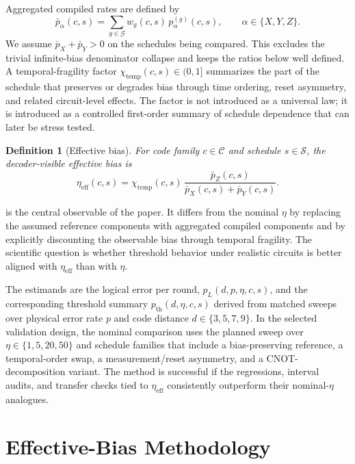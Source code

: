 \documentclass{article} %
\newtheorem{definition}[theorem]{Definition}
\begin{document}
Aggregated compiled rates are defined by
\begin{equation}
\label{eq:aggregated-components}
\bar p_\alpha(c,s) = \sum_{g \in \mathcal{G}} w_g(c,s)\, p_\alpha^{(g)}(c,s),
\qquad \alpha \in \{X,Y,Z\}.
\end{equation}
We assume $\bar p_X + \bar p_Y > 0$ on the schedules being compared. This excludes the trivial infinite-bias denominator collapse and keeps the ratios below well defined. A temporal-fragility factor $\chi_{\mathrm{temp}}(c,s) \in (0,1]$ summarizes the part of the schedule that preserves or degrades bias through time ordering, reset asymmetry, and related circuit-level effects. The factor is not introduced as a universal law; it is introduced as a controlled first-order summary of schedule dependence that can later be stress tested.

\begin{definition}[Effective bias]
\label{def:etaeff}
For code family $c \in \mathcal{C}$ and schedule $s \in \mathcal{S}$, the decoder-visible effective bias is
\begin{equation}
\label{eq:eta-eff-def}
\eta_{\mathrm{eff}}(c,s) =
\chi_{\mathrm{temp}}(c,s)\,
\frac{\bar p_Z(c,s)}{\bar p_X(c,s)+\bar p_Y(c,s)}.
\end{equation}
\end{definition}

 is the central observable of the paper. It differs from the nominal $\eta$ by replacing the assumed reference components with aggregated compiled components and by explicitly discounting the observable bias through temporal fragility. The scientific question is whether threshold behavior under realistic circuits is better aligned with $\eta_{\mathrm{eff}}$ than with $\eta$.

The estimands are the logical error per round, $p_L(d,p,\eta,c,s)$, and the corresponding threshold summary $p_{\mathrm{th}}(d,\eta,c,s)$ derived from matched sweeps over physical error rate $p$ and code distance $d \in \{3,5,7,9\}$. In the selected validation design, the nominal comparison uses the planned sweep over $\eta \in \{1,5,20,50\}$ and schedule families that include a bias-preserving reference, a temporal-order swap, a measurement/reset asymmetry, and a CNOT-decomposition variant. The method is successful if the regressions, interval audits, and transfer checks tied to $\eta_{\mathrm{eff}}$ consistently outperform their nominal-$\eta$ analogues.

\section{Effective-Bias Methodology}
\label{sec:method}
\end{document}
